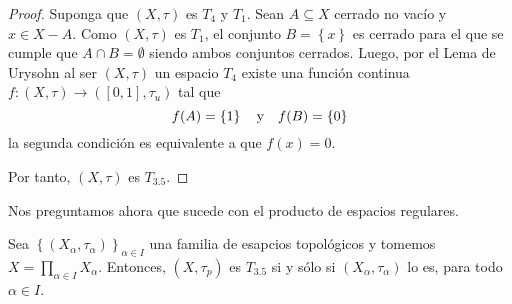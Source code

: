 \documentclass[12pt]{report}
\theoremstyle{largebreak}
\newcommand\cf[3]{\ensuremath{#1:#2\rightarrow#3}}
\begin{document}
    \begin{proof}
        Suponga que $(X,\tau)$ es $T_4$ y $T_1$. Sean $A\subseteq X$ cerrado no vacío y $x\in X-A$. Como $(X,\tau)$ es $T_1$, el conjunto $B=\left\{x \right\}$ es cerrado para el que se cumple que $A\cap B=\emptyset$ siendo ambos conjuntos cerrados. Luego, por el Lema de Urysohn al ser $(X,\tau)$ un espacio $T_4$ existe una función continua $\cf{f}{(X,\tau)}{([0,1],\tau_u)}$ tal que
        \begin{equation*}
            f(A)=\left\{1 \right\}\quad\textup{y}\quad f(B)=\left\{0 \right\}
        \end{equation*}
        la segunda condición es equivalente a que $f(x)=0$.

        Por tanto, $(X,\tau)$ es $T_{3.5}$.
    \end{proof}

    Nos preguntamos ahora que sucede con el producto de espacios regulares.

    \begin{propo}
        Sea $\left\{(X_\alpha,\tau_\alpha) \right\}_{ \alpha\in I}$ una familia de esapcios topológicos y tomemos $X=\prod_{ \alpha\in I}X_\alpha$. Entonces, $(X,\tau_p)$ es $T_{3.5}$ si y sólo si $(X_\alpha,\tau_\alpha)$ lo es, para todo $\alpha\in I$.
    \end{propo}
\end{document}

